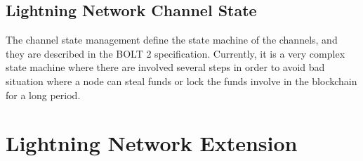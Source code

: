 \subsection{Lightning Network Channel State}
\label{sec:channel_state}

The channel state management define the state machine of the channels, and they are described in the BOLT 2 specification. Currently, it is a very complex
state machine where there are involved several steps in order to avoid bad
situation where a node can steal funds or lock the funds involve in the blockchain for a long period.

\section{Lightning Network Extension}
